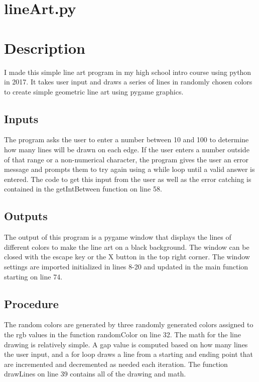 \documentclass{assignment}
\begin{document}

\section*{lineArt.py}


\section*{Description}
\quad I made this simple line art program in my high school intro course using python in 2017. It takes user input and draws a series of lines in randomly chosen colors to create simple geometric line art using pygame graphics.

\subsection*{Inputs}
\quad The program asks the user to enter a number between 10 and 100 to determine how many lines will be drawn on each edge. If the user enters a number outside of that range or a non-numerical character, the program gives the user an error message and prompts them to try again using a while loop until a valid answer is entered. The code to get this input from the user as well as the error catching is contained in the getIntBetween function on line 58.

\subsection*{Outputs}
\quad The output of this program is a pygame window that displays the lines of different colors to make the line art on a black background. The window can be closed with the escape key or the X button in the top right corner. The window settings are imported initialized in lines 8-20 and updated in the main function starting on line 74.

\subsection*{Procedure}
\quad The random colors are generated by three randomly generated colors assigned to the rgb values in the function randomColor on line 32. The math for the line drawing is relatively simple. A gap value is computed based on how many lines the user input, and a for loop draws a line from a starting and ending point that are incremented and decremented as needed each iteration. The function drawLines on line 39 contains all of the drawing and math.
\end{document}
